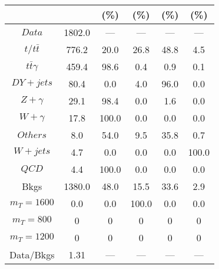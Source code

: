 \begin{figure}
\begin{minipage}[c]{0.32\textwidth}
{\begin{tabular}{cccccc}
 &  & (\%) & (\%) & (\%) & (\%)  \\
\hline
                                                                      $ Data $ &  1802.0 &  --- &  --- &  --- &  ---\\
$ t/t\bar{t} $ &  776.2 &  20.0 &  26.8 &  48.8 &  4.5\\
$ t\bar{t}\gamma $ &  459.4 &  98.6 &  0.4 &  0.9 &  0.1\\
$ DY+jets $ &  80.4 &  0.0 &  4.0 &  96.0 &  0.0\\
$ Z+\gamma $ &  29.1 &  98.4 &  0.0 &  1.6 &  0.0\\
$ W+\gamma $ &  17.8 &  100.0 &  0.0 &  0.0 &  0.0\\
$ Others $ &  8.0 &  54.0 &  9.5 &  35.8 &  0.7\\
$ W+jets $ &  4.7 &  0.0 &  0.0 &  0.0 &  100.0\\
$ QCD $ &  4.4 &  100.0 &  0.0 &  0.0 &  0.0\\
Bkgs &  1380.0 &  48.0 &  15.5 &  33.6 &  2.9\\
$ m_{T} = 1600 $ &  0.0 &  0.0 &  100.0 &  0.0 &  0.0\\
$ m_{T} = 800 $ &  0 &  0 &  0 &  0 &  0\\
$ m_{T} = 1200 $ &  0 &  0 &  0 &  0 &  0\\
Data/Bkgs &  1.31 &  --- &  --- &  --- &  ---\\
\hline
\end{tabular}
}
\end{minipage}
\end{figure}

